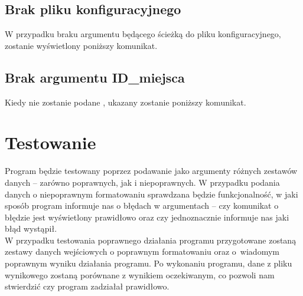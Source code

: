 \documentclass[12pt,a4paper]{article}
\begin{document}
\subsection{Brak pliku konfiguracyjnego}
W przypadku braku argumentu będącego ścieżką do pliku konfiguracyjnego, zostanie wyświetlony poniższy komunikat.\\
\subsection{Brak argumentu ID\_miejsca}
Kiedy nie zostanie podane , ukazany zostanie poniższy komunikat.\\
\section{Testowanie}
Program będzie testowany poprzez podawanie jako argumenty różnych zestawów danych -- zarówno poprawnych, jak i niepoprawnych. W przypadku podania danych o niepoprawnym formatowaniu sprawdzana będzie funkcjonalność, w jaki sposób program informuje nas o błędach w argumentach -- czy komunikat o błędzie jest wyświetlony prawidłowo oraz czy jednoznacznie informuje nas jaki błąd wystąpił.\\
\indent W przypadku testowania poprawnego działania programu przygotowane zostaną zestawy danych wejściowych o poprawnym formatowaniu oraz o~wiadomym poprawnym wyniku działania programu. Po wykonaniu programu, dane z pliku wynikowego zostaną porównane z wynikiem oczekiwanym, co pozwoli nam stwierdzić czy program zadziałał prawidłowo.
\end{document}
